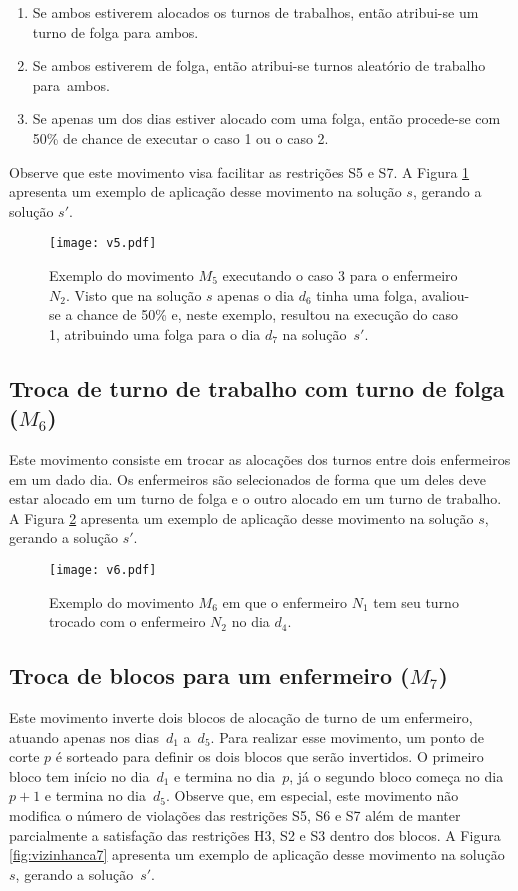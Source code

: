 \documentclass[cic,tc, twoside]{iiufrgs}
\begin{document}
\begin{enumerate}
	\item Se ambos estiverem alocados os turnos de trabalhos, então atribui-se um turno de folga para ambos.
	\item Se ambos estiverem de folga, então atribui-se turnos aleatório de trabalho para~\mbox{ambos}. 
	\item Se apenas um dos dias estiver alocado com uma folga, então procede-se com 50\% de chance de executar o caso 1 ou o caso 2. 
\end{enumerate} 
Observe que este movimento visa facilitar as restrições S5 e S7. 
A Figura \ref{fig:vizinhanca5} apresenta um exemplo de aplicação desse movimento na solução $s$, gerando a solução $s'$. 

\begin{figure}[ht!]
\texttt{[image: v5.pdf]}
\centering
\caption{Exemplo do movimento $M_5$ executando o caso 3 para o enfermeiro $N_2$. Visto que na solução $s$ apenas o dia $d_6$ tinha uma folga, 
avaliou-se a chance de 50\% e, neste exemplo, resultou na execução do caso 1, atribuindo uma folga para o dia $d_7$ na solução~$s'$.} 
\label{fig:vizinhanca5}
\end{figure}

\subsection{Troca de turno de trabalho com turno de folga ($M_6$)}
Este movimento consiste em trocar as alocações dos turnos entre dois enfermeiros em um dado dia. Os enfermeiros são selecionados de forma 
que um deles deve estar alocado em um turno de folga e o outro alocado em um turno de trabalho.
A Figura \ref{fig:vizinhanca6} apresenta um exemplo de aplicação desse movimento na solução $s$, gerando a solução $s'$. 

\begin{figure}[ht!]
\texttt{[image: v6.pdf]}
\centering
\caption{Exemplo do movimento $M_6$ em que o enfermeiro $N_1$ tem seu turno trocado com o enfermeiro $N_2$ no dia $d_4$.} 
\label{fig:vizinhanca6}
\end{figure}


\subsection{Troca de blocos para um enfermeiro ($M_7$)}
Este movimento inverte dois blocos de alocação de turno de um enfermeiro, atuando apenas nos dias~$d_1$ a~$d_5$.
Para realizar esse movimento, um ponto de corte $p$ é sorteado para definir os dois blocos que serão invertidos.
O primeiro bloco tem início no dia~$d_1$ e termina no dia~$p$, já o segundo bloco começa no dia~$p+1$ e termina no dia~$d_5$. 
Observe que, em especial, este movimento não modifica o número de violações das restrições S5, S6 e S7 além de manter parcialmente a satisfação das restrições H3, S2 e S3 dentro dos blocos. 
A Figura \ref{fig:vizinhanca7} apresenta um exemplo de aplicação desse movimento na solução~$s$, gerando a solução~$s'$. 
\end{document}
